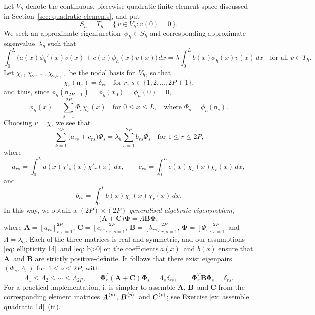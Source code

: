 Let $V_h$ denote the continuous, piecewise-quadratic finite element space 
discussed in Section~\ref{sec: quadratic elements}, and put
\[
S_h=T_h=\{\,v\in V_h:v(0)=0\,\}.
\]
We seek an approximate eigenfunction~$\phi_h\in S_h$ and corresponding 
approximate eigenvalue~$\lambda_h$ such that
\[
\int_0^L\bigl(a(x)\phi_h'(x)v(x)+c(x)\phi_h(x)v(x)\bigr)\,dx
	=\lambda\int_0^Lb(x)\phi_h(x)v(x)\,dx
\quad\text{for all $v\in T_h$.}
\]
Let $\chi_1$, $\chi_2$, \dots, $\chi_{2P+1}$ be the nodal basis for~$V_h$, so 
that
\[
\chi_r(\mathsf{n}_s)=\delta_{rs}
	\quad\text{for $r$, $s\in\{1,2,\ldots, 2P+1\}$,}
\]
and thus, since $\phi_h(\mathsf{n}_{2P+1})=\phi_h(x_0)=\phi_h(0)=0$,
\[
\phi_h(x)=\sum_{s=1}^{2P}\Phi_s\chi_s(x)
	\quad\text{for $0\le x\le L$},
	\quad\text{where $\Phi_s=\phi_h(\mathsf{n}_s)$.}
\]
Choosing $v=\chi_r$ we see that
\[
\sum_{k=1}^{2P}\bigl(a_{rs}+c_{rs}\bigr)\Phi_s
	=\lambda_h\sum_{s=1}^{2P}b_{rs}\Phi_s\quad\text{for $1\le r\le 2P$,}
\]
where
\[
a_{rs}=\int_0^La(x)\chi'_s(x)\chi'_r(x)\,dx,\qquad
c_{rs}=\int_0^Lc(x)\chi_s(x)\chi_r(x)\,dx,
\]
and
\[
b_{rs}=\int_0^Lb(x)\chi_s(x)\chi_r(x)\,dx.
\]
In this way, we obtain a $(2P)\times(2P)$ \emph{generalised algebraic 
eigenproblem},
\[
\bigl(\boldsymbol{A}+\boldsymbol{C}\bigr)\boldsymbol{\Phi}
	=\Lambda\boldsymbol{B}\boldsymbol{\Phi},
\]
where $\boldsymbol{A}=[a_{rs}]_{r,s=1}^{2P}$, 
$\boldsymbol{C}=[c_{rs}]_{r,s=1}^{2P}$, 
$\boldsymbol{B}=[b_{rs}]_{r,s=1}^{2P}$, 
$\boldsymbol{\Phi}=[\Phi_s]_{s=1}^{2P}$~and 
$\Lambda=\lambda_h$.  Each of the three matrices is real and symmetric, and our 
assumptions \eqref{eq: ellipticity 1d}~and \eqref{eq: b>0} on the coefficients 
$a(x)$~and $b(x)$ ensure that $\boldsymbol{A}$~and $\boldsymbol{B}$ are 
strictly positive-definite.  It follows that there exist eigenpairs 
$(\Phi_s,\Lambda_s)$ for~$1\le s\le 2P$, with
\[
\Lambda_1\le\Lambda_2\le\cdots\le\Lambda_{2P},\qquad
\boldsymbol{\Phi}_r^T(\boldsymbol{A}+\boldsymbol{C})
    \boldsymbol{\Phi}_s=\Lambda_s\delta_{rs},\qquad
\boldsymbol{\Phi}_r^T\boldsymbol{B}\boldsymbol{\Phi}_s=\delta_{rs}.
\]
For a practical implementation, it is simpler to assemble $\boldsymbol{A}$, 
$\boldsymbol{B}$~and $\boldsymbol{C}$ from the corresponding element matrices
$\boldsymbol{A}^{\langle p\rangle}$, $\boldsymbol{B}^{\langle p\rangle}$~and 
$\boldsymbol{C}^{\langle p\rangle}$; see Exercise \ref{ex: assemble quadratic 1d}~(iii).


